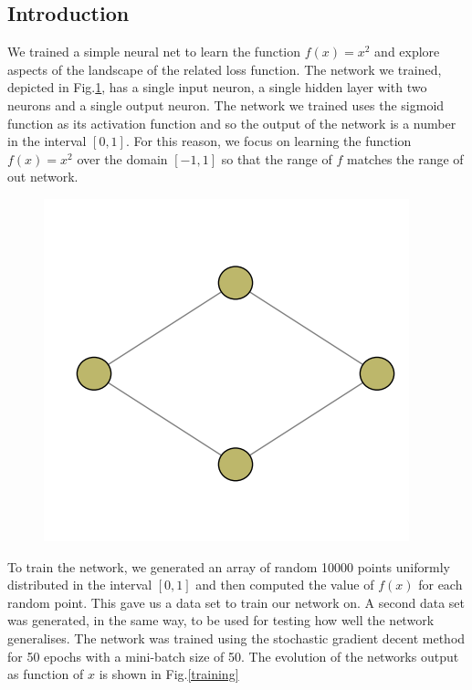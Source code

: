\documentclass[12pt,a4paper]{article}
\begin{document}
\subsection{Introduction}

We trained a simple neural net to learn the function $f(x)=x^2$ and explore aspects of the landscape of the related loss function. The network we trained, depicted in Fig.\ref{DiamondNet}, has a single input neuron, a single hidden layer with two neurons and a single output neuron. The network we trained uses the sigmoid function as its activation function and so the output of the network is a number in the interval $[0,1]$. For this reason, we focus on learning the function $f(x)=x^2$ over the domain $[-1,1]$ so that the range of $f$ matches the range of out network.

\begin{figure}
\center
\includegraphics[scale=0.5]{Images/net_1_2_1.png}
\caption{}
\label{DiamondNet}
\end{figure}


To train the network, we generated an array of random 10000 points uniformly distributed in the interval $[0,1]$ and then computed the value of $f(x)$ for each random point. This gave us a data set to train our network on. A second data set was generated, in the same way, to be used for testing how well the network generalises. The network was trained using the stochastic gradient decent method for 50 epochs with a mini-batch size of 50. The evolution of the networks output as function of $x$ is shown in Fig.\ref{training}
\end{document}

